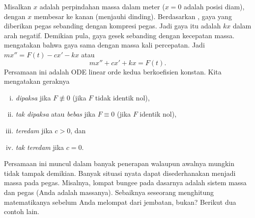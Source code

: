 Misalkan $x$ adalah perpindahan massa dalam meter ($x=0$ adalah posisi diam), dengan $x$ membesar ke kanan (menjauhi dinding). Berdasarkan , gaya yang diberikan pegas sebanding dengan kompresi pegas. Jadi gaya itu adalah $kx$ dalam arah negatif. Demikian pula, gaya gesek sebanding dengan kecepatan massa.  mengatakan bahwa gaya sama dengan massa kali percepatan. Jadi $mx'' = F(t)-cx'-kx$ atau
\begin{equation*}
mx'' + cx' + kx = F(t) .
\end{equation*}
Persamaan ini adalah ODE linear orde kedua berkoefisien konstan\@. Kita mengatakan geraknya
\begin{enumerate}[(i)]
\item \emph{dipaksa} jika $F \not\equiv 0$ (jika $F$ tidak identik nol),
\item \emph{tak dipaksa} atau \emph{bebas} jika $F \equiv 0$ (jika $F$ identik nol),
\item \emph{teredam} jika $c > 0$, dan
\item \emph{tak teredam} jika $c = 0$.
\end{enumerate}

Persamaan ini muncul dalam banyak penerapan walaupun awalnya mungkin tidak tampak demikian. Banyak situasi nyata dapat disederhanakan menjadi massa pada pegas. Misalnya, lompat bungee pada dasarnya adalah sistem massa dan pegas (Anda adalah massanya). Sebaiknya seseorang menghitung matematikanya sebelum Anda melompat dari jembatan, bukan? Berikut dua contoh lain.

\medskip


